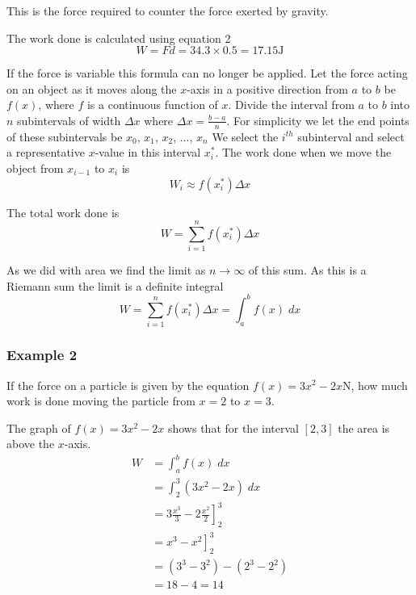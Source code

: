 This is the force required to counter the force exerted by gravity. 

The work
done is calculated using equation 2
\begin{equation*}W =F d =34.3 \times 0.5 =17.15 \mbox{J}
\end{equation*}

If the force is variable this formula can no longer be applied. Let
the force acting on an object as it moves along the $x$-axis in a positive direction from $a$ to $b$ be $f (x)$, where $f$ is a continuous function of $x$. Divide the interval from $a$ to $b$ into $n$ subintervals of width $ \Delta x$ where $ \Delta x =\frac{b -a}{n}$. For
simplicity we let the end points of these subintervals be $x_{0}$, $x_{1}$, $x_{2}$, ..., $x_{n}$ We select the $i^{t h}$ subinterval and select a representative $x$-value in this interval $x_{i}^{ \ast }$. The work done when we move the object from $x_{i -1}$ to $x_{i}$ is
\begin{equation*}W_{i} \approx f (x_{i}^{ \ast })  \Delta x
\end{equation*}

The total work done is
\begin{equation}W =\sum _{i =1}^{n}f (x_{i}^{ \ast })  \Delta x\tag{3}
\end{equation}

As we did with area we find the limit as $n \rightarrow \infty $ of this sum. As this is a Riemann sum the limit is a definite integral
\begin{equation}W =\sum _{i =1}^{n}f (x_{i}^{ \ast })  \Delta x =\int _{a}^{b}f (x)\; d x\tag{4}
\end{equation}

\subsubsection{Example 2}
If the force on a particle is given by the equation $f (x) =3 x^{2} -2 x \mbox{N}$, how much work is done moving the particle from $x =2$ to $x =3$. 

The graph of $f (x) =3 x^{2} -2 x$ shows that for the interval $\left [2 ,3\right ]$ the area is above the $x$-axis.
\begin{align*}W &  = \int _{a}^{b}f (x)\; d x \\
 &  = \int _{2}^{3}\left (3 x^{2} -2 x\right )\; d x \\
 &  = \left .3 \frac{x^{3}}{3} -2 \frac{x^{2}}{2}\right ]_{2}^{3} \\
 &  = \left .x^{3} -x^{2}\right ]_{2}^{3} \\
 &  = \left (3^{3} -3^{2}\right ) -\left (2^{3} -2^{2}\right ) \\
 &  = 18 -4 =14\end{align*}


